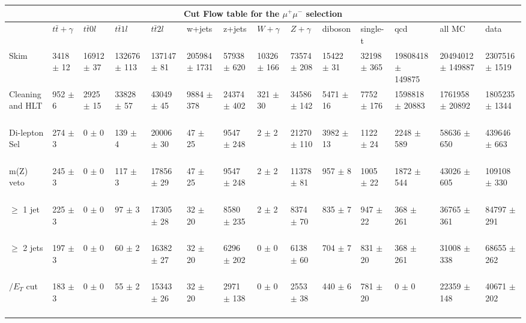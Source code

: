 \begin{table}
  \centering 
\resizebox{\columnwidth}{!} {

\begin{tabular}{|l|l|l|l|l|l|l|l|l|l|l|l|l|l|}
\hline
\multicolumn{14}{|c|}{\textbf{Cut Flow table for the $\mu^+\mu^-$ selection}} \\
\hline
 & $t\bar{t}+\gamma$ & $t\bar{t} 0l$ & $t\bar{t} 1l$ & $t\bar{t} 2l$ & w+jets & z+jets & $W+\gamma$ & $Z+\gamma$ & diboson & single-t & qcd & all MC & data \\
 \hline
Skim & 3418 $\pm$ 12 \ & 16912 $\pm$ 37 \ & 132676 $\pm$ 113 \ & 137147 $\pm$ 81 \ & 205984 $\pm$ 1731 \ & 57938 $\pm$ 620 \ & 10326 $\pm$ 166 \ & 73574 $\pm$ 208 \ & 15422 $\pm$ 31 \ & 32198 $\pm$ 365 \ & 19808418 $\pm$ 149875\ & 20494012 $\pm$ 149887 \ & 2307516 $\pm$ 1519 \\
Cleaning and HLT & 952 $\pm$ 6 \ & 2925 $\pm$ 15 \ & 33828 $\pm$ 57 \ & 43049 $\pm$ 45 \ & 9884 $\pm$ 378 \ & 24374 $\pm$ 402 \ & 321 $\pm$ 30 \ & 34586 $\pm$ 142 \ & 5471 $\pm$ 16 \ & 7752 $\pm$ 176 \ & 1598818 $\pm$ 20883\ & 1761958 $\pm$ 20892 \ & 1805235 $\pm$ 1344 \\
Di-lepton Sel & 274 $\pm$ 3 \ & 0 $\pm$ 0 \ & 139 $\pm$ 4 \ & 20006 $\pm$ 30 \ & 47 $\pm$ 25 \ & 9547 $\pm$ 248 \ & 2 $\pm$ 2 \ & 21270 $\pm$ 110 \ & 3982 $\pm$ 13 \ & 1122 $\pm$ 24 \ & 2248 $\pm$ 589\ & 58636 $\pm$ 650 \ & 439646 $\pm$ 663 \\
m(Z) veto & 245 $\pm$ 3 \ & 0 $\pm$ 0 \ & 117 $\pm$ 3 \ & 17856 $\pm$ 29 \ & 47 $\pm$ 25 \ & 9547 $\pm$ 248 \ & 2 $\pm$ 2 \ & 11378 $\pm$ 81 \ & 957 $\pm$ 8 \ & 1005 $\pm$ 22 \ & 1872 $\pm$ 544\ & 43026 $\pm$ 605 \ & 109108 $\pm$ 330 \\
$\geq$ 1 jet & 225 $\pm$ 3 \ & 0 $\pm$ 0 \ & 97 $\pm$ 3 \ & 17305 $\pm$ 28 \ & 32 $\pm$ 20 \ & 8580 $\pm$ 235 \ & 2 $\pm$ 2 \ & 8374 $\pm$ 70 \ & 835 $\pm$ 7 \ & 947 $\pm$ 22 \ & 368 $\pm$ 261\ & 36765 $\pm$ 361 \ & 84797 $\pm$ 291 \\
$\geq$ 2 jets & 197 $\pm$ 3 \ & 0 $\pm$ 0 \ & 60 $\pm$ 2 \ & 16382 $\pm$ 27 \ & 32 $\pm$ 20 \ & 6296 $\pm$ 202 \ & 0 $\pm$ 0 \ & 6138 $\pm$ 60 \ & 704 $\pm$ 7 \ & 831 $\pm$ 20 \ & 368 $\pm$ 261\ & 31008 $\pm$ 338 \ & 68655 $\pm$ 262 \\
$\slash{E_{T}}$ cut & 183 $\pm$ 3 \ & 0 $\pm$ 0 \ & 55 $\pm$ 2 \ & 15343 $\pm$ 26 \ & 32 $\pm$ 20 \ & 2971 $\pm$ 138 \ & 0 $\pm$ 0 \ & 2553 $\pm$ 38 \ & 440 $\pm$ 6 \ & 781 $\pm$ 20 \ & 0 $\pm$ 0\ & 22359 $\pm$ 148 \ & 40671 $\pm$ 202 \\

\end{tabular}}
\end{table}
